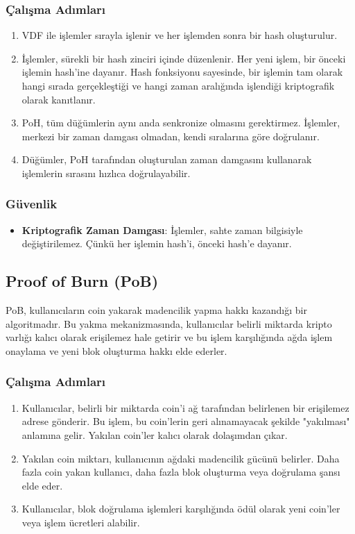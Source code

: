 \subsubsection{Çalışma Adımları}

\begin{enumerate}
    \item VDF ile işlemler sırayla işlenir ve her işlemden sonra bir hash oluşturulur.
    \item İşlemler, sürekli bir hash zinciri içinde düzenlenir. Her yeni işlem, bir önceki işlemin hash'ine dayanır. Hash fonksiyonu sayesinde, bir işlemin tam olarak hangi sırada gerçekleştiği ve hangi zaman aralığında işlendiği kriptografik olarak kanıtlanır.
    \item PoH, tüm düğümlerin aynı anda senkronize olmasını gerektirmez. İşlemler, merkezi bir zaman damgası olmadan, kendi sıralarına göre doğrulanır.
    \item Düğümler, PoH tarafından oluşturulan zaman damgasını kullanarak işlemlerin sırasını hızlıca doğrulayabilir.
\end{enumerate}

\subsubsection{Güvenlik}

\begin{itemize}
    \item \textbf{Kriptografik Zaman Damgası}: İşlemler, sahte zaman bilgisiyle değiştirilemez. Çünkü her işlemin hash'i, önceki hash'e dayanır.
\end{itemize}

\newpage

\subsection{Proof of Burn (PoB)}

PoB, kullanıcıların coin yakarak madencilik yapma hakkı kazandığı bir algoritmadır. Bu yakma mekanizmasında, kullanıcılar belirli miktarda kripto varlığı kalıcı olarak erişilemez hale getirir ve bu işlem karşılığında ağda işlem onaylama ve yeni blok oluşturma hakkı elde ederler.

\subsubsection{Çalışma Adımları}

\begin{enumerate}
    \item Kullanıcılar, belirli bir miktarda coin'i ağ tarafından belirlenen bir erişilemez adrese gönderir. Bu işlem, bu coin'lerin geri alınamayacak şekilde "yakılması" anlamına gelir. Yakılan coin'ler kalıcı olarak dolaşımdan çıkar.
    \item Yakılan coin miktarı, kullanıcının ağdaki madencilik gücünü belirler. Daha fazla coin yakan kullanıcı, daha fazla blok oluşturma veya doğrulama şansı elde eder.
    \item Kullanıcılar, blok doğrulama işlemleri karşılığında ödül olarak yeni coin'ler veya işlem ücretleri alabilir.
\end{enumerate}

